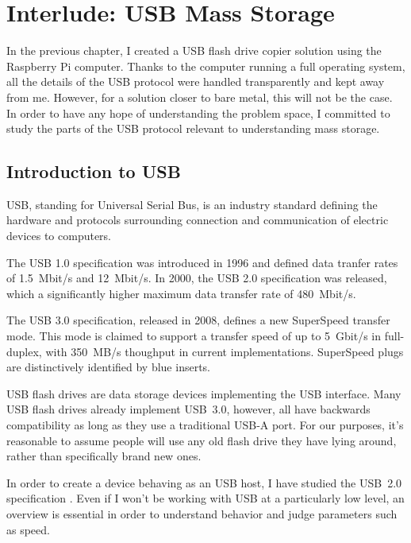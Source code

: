\chapter{Interlude: USB Mass Storage}
    In the previous chapter, I created a USB flash drive copier solution using the Raspberry Pi computer.  Thanks to the computer running a full operating system, all the details of the USB protocol were handled transparently and kept away from me.  However, for a solution closer to bare metal, this will not be the case.  In order to have any hope of understanding the problem space, I committed to study the parts of the USB protocol relevant to understanding mass storage.
    
    \section{Introduction to USB}
    
    USB, standing for Universal Serial Bus, is an industry standard defining the hardware and protocols surrounding connection and communication of electric devices to computers.  
    
    The USB 1.0 specification was introduced in 1996 and defined data tranfer rates of 1.5~Mbit/s and 12~Mbit/s\cite{hui1394}.   In 2000, the USB 2.0 specification was released, which a significantly higher maximum data transfer rate of 480~Mbit/s.
    
    The USB 3.0 specification, released in 2008, defines a new SuperSpeed transfer mode.  This mode is claimed to support a transfer speed of up to 5~Gbit/s in full-duplex, with 350~MB/s thoughput in current implementations\cite{usb-3-hp}.  SuperSpeed plugs are distinctively identified by blue inserts. 
    
    USB flash drives are data storage devices implementing the USB interface.  Many USB flash drives already implement USB~3.0\cite{wirecutter-best-usb-3-0}, however, all have backwards compatibility as long as they use a traditional USB‑A port.  For our purposes, it's reasonable to assume people will use any old flash drive they have lying around, rather than specifically brand new ones.
    
    In order to create a device behaving as an USB host, I have studied the USB~2.0 specification .  Even if I won't be working with USB at a particularly low level, an overview is essential in order to understand behavior and judge parameters such as speed.
    
